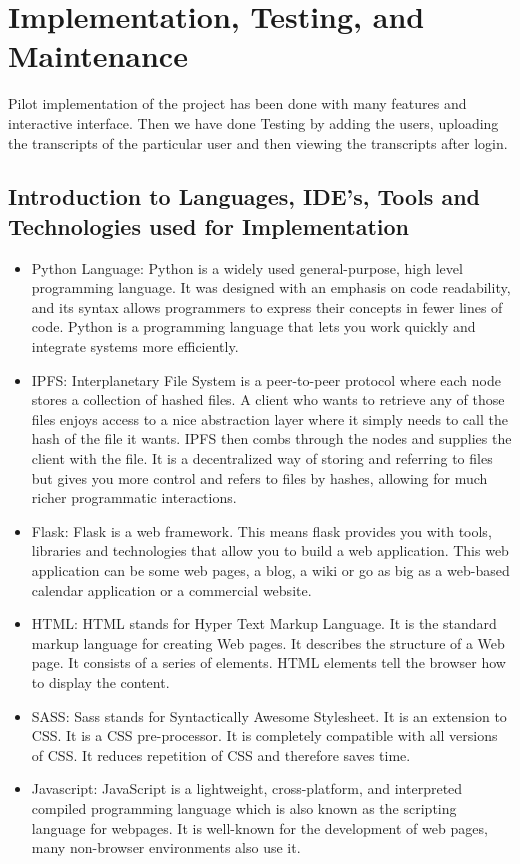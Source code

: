\newpage
\section{Implementation, Testing, and Maintenance}

Pilot implementation of the project has been done with many features and interactive interface. Then we have done Testing by adding the users, uploading the transcripts of the particular user and then viewing the transcripts after login. 
\subsection{Introduction to Languages, IDE’s, Tools and Technologies used for
Implementation}
\begin{itemize}
    \item Python Language: Python is a widely used general-purpose, high level programming language. It was designed with an emphasis on code readability, and its syntax allows programmers to express their concepts in fewer lines of code. Python is a programming language that lets you work quickly and integrate systems more efficiently.
    \item IPFS: Interplanetary File System is a peer-to-peer protocol where each node stores a collection of hashed files. A client who wants to retrieve any of those files enjoys access to a nice abstraction layer where it simply needs to call the hash of the file it wants. IPFS then combs through the nodes and supplies the client with the file. It is a decentralized way of storing and referring to files but gives you more control and refers to files by hashes, allowing for much richer programmatic interactions.
    \item Flask: Flask is a web framework. This means flask provides you with tools, libraries and technologies that allow you to build a web application. This web application can be some web pages, a blog, a wiki or go as big as a web-based calendar application or a commercial website.
    \item HTML: HTML stands for Hyper Text Markup Language. It is the standard markup language for creating Web pages. It describes the structure of a Web page. It consists of a series of elements. HTML elements tell the browser how to display the content.
    \item SASS: Sass stands for Syntactically Awesome Stylesheet. It is an extension to CSS. It is a CSS pre-processor. It is completely compatible with all versions of CSS. It reduces repetition of CSS and therefore saves time.
    \item Javascript: JavaScript is a lightweight, cross-platform, and interpreted compiled programming language which is also known as the scripting language for webpages. It is well-known for the development of web pages, many non-browser environments also use it.
\end{itemize}
